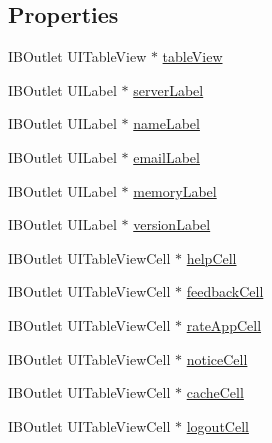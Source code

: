 \subsection*{Properties}
\begin{DoxyCompactItemize}
\item 
I\-B\-Outlet U\-I\-Table\-View $\ast$ \hyperlink{interface_w_setting_view_controller_a0cbddfe82db3125cadff8544c6a504ef}{table\-View}
\item 
I\-B\-Outlet U\-I\-Label $\ast$ \hyperlink{interface_w_setting_view_controller_a96907397f7b98500c0e4907c81bcca20}{server\-Label}
\item 
I\-B\-Outlet U\-I\-Label $\ast$ \hyperlink{interface_w_setting_view_controller_a7d2e0e442aa5e8476271ec7c9fd9f80b}{name\-Label}
\item 
I\-B\-Outlet U\-I\-Label $\ast$ \hyperlink{interface_w_setting_view_controller_a46422524db8175103ccc89cc575c07bf}{email\-Label}
\item 
I\-B\-Outlet U\-I\-Label $\ast$ \hyperlink{interface_w_setting_view_controller_a30b3ada36f1a888f45ad374422b50b3a}{memory\-Label}
\item 
I\-B\-Outlet U\-I\-Label $\ast$ \hyperlink{interface_w_setting_view_controller_a3b816e40ba7b951df05c38d1945f7ac3}{version\-Label}
\item 
I\-B\-Outlet U\-I\-Table\-View\-Cell $\ast$ \hyperlink{interface_w_setting_view_controller_a5efaef982c59d2e750d5bbe94b0f6485}{help\-Cell}
\item 
I\-B\-Outlet U\-I\-Table\-View\-Cell $\ast$ \hyperlink{interface_w_setting_view_controller_a72976fc835a6b0fe9c2115d4e28a1435}{feedback\-Cell}
\item 
I\-B\-Outlet U\-I\-Table\-View\-Cell $\ast$ \hyperlink{interface_w_setting_view_controller_a63bceb12432b0d8a0ec896170c70a435}{rate\-App\-Cell}
\item 
I\-B\-Outlet U\-I\-Table\-View\-Cell $\ast$ \hyperlink{interface_w_setting_view_controller_a21492d32577ac86e313820827c29cf14}{notice\-Cell}
\item 
I\-B\-Outlet U\-I\-Table\-View\-Cell $\ast$ \hyperlink{interface_w_setting_view_controller_ab0c3463a35d09a4288a8bd3db641fdf1}{cache\-Cell}
\item 
I\-B\-Outlet U\-I\-Table\-View\-Cell $\ast$ \hyperlink{interface_w_setting_view_controller_a3b367d26434694d49e611d0a4b69387f}{logout\-Cell}
\end{DoxyCompactItemize}


